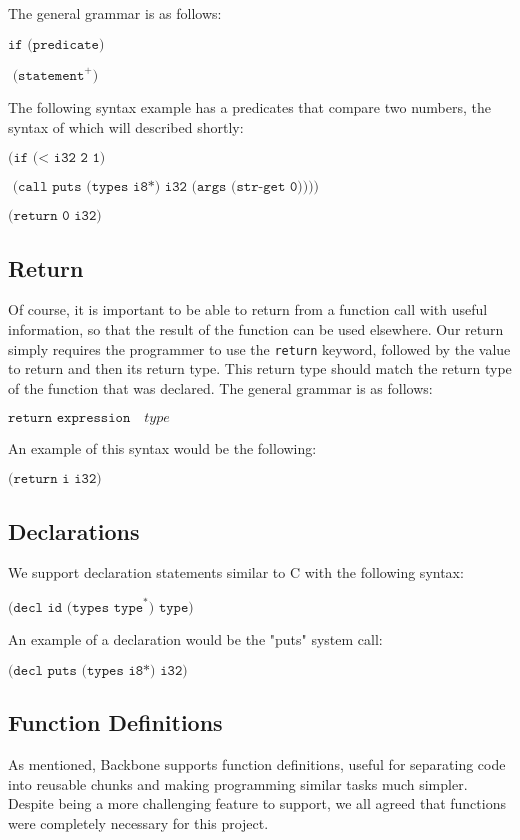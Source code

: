 \documentclass[journal=jacsat, manuscript=article]{achemso}
\begin{document}
The general grammar is as follows:

$\texttt{if (predicate)}$

$\texttt{    (statement}^+\texttt{)}$

The following syntax example has a predicates that compare two numbers, the syntax of which will described shortly:

$\texttt{(if (< i32 2 1)}$

$\texttt{     (call puts (types i8*) i32 (args (str-get 0))))}$

$\texttt{(return 0 i32)}$

\subsection{Return}

Of course, it is important to be able to return from a function call with useful information, so that the result of the function can be used elsewhere.
Our return simply requires the programmer to use the \texttt{return} keyword, followed by the value to return and then its return type. This return type should match the return type of the function that was declared.
The general grammar is as follows:

$\texttt{return expression}\quad type$

An example of this syntax would be the following:

$\texttt{(return i i32)}$

\subsection{Declarations}

We support declaration statements similar to C with the following syntax:

$\texttt{(decl id (types type}^* \texttt{) type)}$

An example of a declaration would be the "puts" system call:

$\texttt{(decl puts (types i8*) i32)}$

\subsection{Function Definitions}

As mentioned, Backbone supports function definitions, useful for separating code into reusable chunks and making programming similar tasks much simpler. Despite being a more challenging feature to support, we all agreed that functions were completely necessary for this project. 
\end{document}
